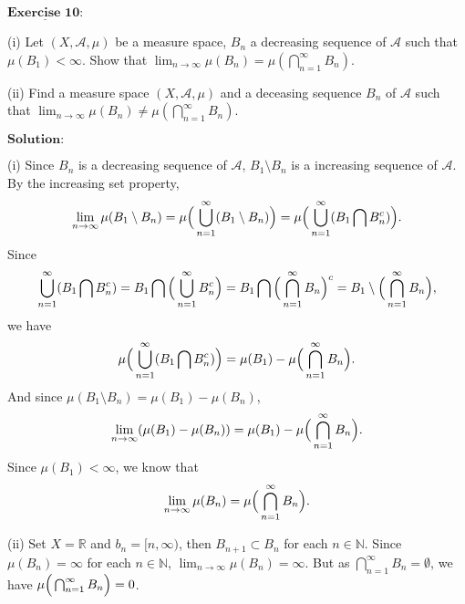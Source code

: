\documentclass[12pt,a4paper]{ctexart}
\begin{document}
\newpage

$\underline{\textbf{Exercise 10:}}$

(i) Let $(X, \mathcal A, \mu)$ be a measure space, $B_n$ a decreasing sequence of $\mathcal A$ such that $\mu(B_1) < \infty$. Show that $\lim_{n \to \infty} \mu(B_n) = \mu(\bigcap_{n=1}^{\infty} B_n)$.

(ii) Find a measure space $(X, \mathcal A, \mu)$ and a deceasing sequence $B_n$ of $\mathcal A$ such that $\lim_{n \to \infty} \mu(B_n) \neq \mu(\bigcap_{n=1}^{\infty} B_n)$.

\vspace{8pt}
$\textbf{Solution:}$

(i) Since $B_n$ is a decreasing sequence of $\mathcal A$, $B_1 \setminus B_n$ is a increasing sequence of $\mathcal A$. By the increasing set property,
$$\lim_{n \to \infty} \mu(B_1 \setminus B_n) = \mu \Big{(} \bigcup_{n=1}^{\infty} (B_1 \setminus B_n) \Big{)} = \mu \Big{(} \bigcup_{n=1}^{\infty} (B_1 \bigcap B_n^c) \Big{)}.$$
Since 
$$\bigcup_{n=1}^{\infty} (B_1 \bigcap B_n^c) = B_1 \bigcap \Big{(} \bigcup_{n=1}^{\infty}  B_n^c \Big{)} = B_1 \bigcap \Big{(} \bigcap_{n=1}^{\infty}  B_n \Big{)}^c = B_1 \setminus \Big{(} \bigcap_{n=1}^{\infty}  B_n \Big{)},$$
we have
$$\mu \Big{(} \bigcup_{n=1}^{\infty} (B_1 \bigcap B_n^c) \Big{)} = \mu(B_1) - \mu\Big{(} \bigcap_{n=1}^{\infty}  B_n \Big{)}. $$
And since $\mu(B_1 \setminus B_n) = \mu(B_1) - \mu(B_n)$,
$$\lim_{n \to \infty} (\mu(B_1) - \mu(B_n)) = \mu(B_1) - \mu\Big{(} \bigcap_{n=1}^{\infty}  B_n \Big{)}.$$
Since $\mu(B_1) < \infty$, we know that
$$\lim_{n \to \infty} \mu(B_n) = \mu\Big{(} \bigcap_{n=1}^{\infty}  B_n \Big{)}.$$

(ii) Set $X = \mathbb R$ and $b_n = [n, \infty)$, then $B_{n+1} \subset B_n$ for each $n \in \mathbb N$. Since $\mu(B_n) = \infty$ for each $n \in \mathbb N$, $\lim_{n \to \infty} \mu(B_n) = \infty$. But as $\bigcap_{n=1}^{\infty}  B_n = \emptyset$, we have $\mu\Big{(} \bigcap_{n=1}^{\infty}  B_n \Big{)} = 0$.
\end{document}
